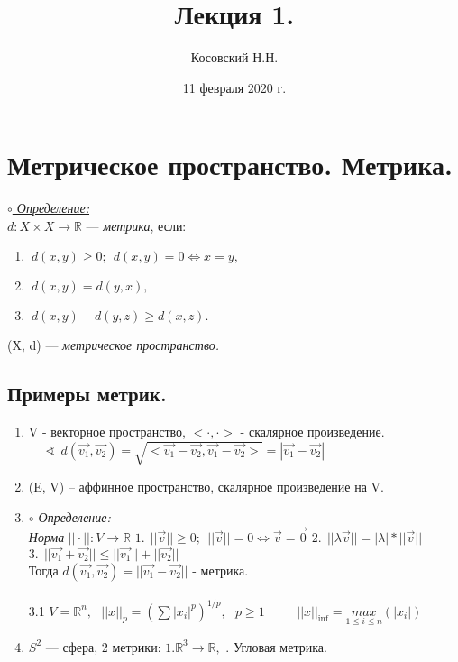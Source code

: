 \documentclass{article}
\title{Лекция 1.}
\author{Косовский Н.Н.}
\date{11 февраля 2020 г.}
\begin{document}
\maketitle
\section{Метрическое пространство. Метрика.}
\underline{\textit{$\circ$ Определение:}}\\

  $d: X \times X\rightarrow \mathbb{R}$ --- \emph{\textit{метрика}}, если:
 \begin{enumerate}
\item $~d\left( x, y\right)\geq 0;~~ d\left( x, y\right) = 0\Longleftrightarrow x=y ,$
\item $~d\left( x, y\right)=d\left( y, x\right) ,$
\item $~d\left( x, y\right)+d\left( y, z\right)\geq d(x, z) .$

\end{enumerate}
 (X, d) --- \textit{метрическое пространство.}
 \\
 \subsection{Примеры метрик.}
 \begin{spacing}{1.5}
 \begin{enumerate}
\item V - векторное пространство, $<\cdot , \cdot >$ - скалярное произведение.
 \\$ ~~~~~~\sphericalangle ~~d(\vec{v_{1}}, \vec{v_{2}}) = \sqrt{<\vec{v_{1}} - \vec{v_{2}},\vec{v_{1}} - \vec{v_{2}}> } = |\vec{v_{1}} - \vec{v_{2}}|$
 \item (E, V) -- аффинное пространство, скалярное произведение на V.
 \item \emph{$\circ$ Определение:}\\
 \emph{Норма }$||\cdot||: V\rightarrow  \mathbb{R}$
 \subitem $1. ~~||\vec{v}||\geq 0 ; ~~||\vec{v}|| = 0 \Longleftrightarrow \vec{v} = \vec{0} $
 \subitem $ 2. ~~||\lambda\vec{v}|| = |\lambda|*||\vec{v}|| $
 \subitem $ 3.~~||\vec{v_{1}} + \vec{v_{2}} ||\leq || \vec{v_{1}} || + ||\vec{v_{2}}||$
 \\Тогда $d(\vec{v_{1}}, \vec{v_{2}}) = ||\vec{v_{1}} - \vec{v_{2}}||$ - метрика.
 \\ \\3.1 $V = \mathbb{R}^{n} ,~~~ ||x||_{p} = (\sum |x_{i}|^{p})^{1/p},~~~ p\geq 1$
 \subsubitem $~~~~~~~~~~||x||_{\inf}=\underset{1\leq i\leq n}{max}(|x_{i}|)$
 \item $S^{2}$ --- сфера, 2 метрики:
 \subsubitem $1. \mathbb{R}^{3}\rightarrow \mathbb{R},$ 
 . Угловая метрика.
\end{enumerate}
\end{spacing}
\end{document}
